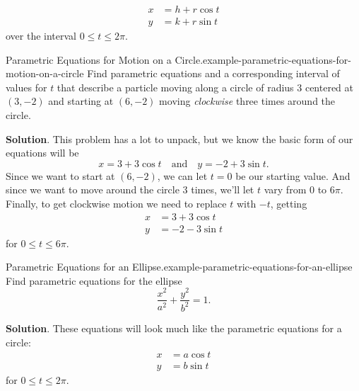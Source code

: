 \documentclass[10pt,]{book}
\numberwithin{equation}{section}
\newcommand{\qq}[1]{\quad\text{#1}\quad}
\newcommand{\amp}{&}
\begin{document}
\begin{align*}
x \amp = h + r\cos t \\
y \amp = k + r\sin t 
\end{align*}
over the interval \(0\leq t\leq 2\pi\).%
\begin{example}{Parametric Equations for Motion on a Circle.}{example-parametric-equations-for-motion-on-a-circle}%
\hypertarget{p-1000}{}%
Find parametric equations and a corresponding interval of values for \(t\) that describe a particle moving along a circle of radius \(3\) centered at \((3,-2)\) and starting at \((6,-2)\) moving \emph{clockwise} three times around the circle.%
\par\smallskip%
\noindent\textbf{Solution}.\hypertarget{solution-201}{}\quad%
\hypertarget{p-1001}{}%
This problem has a lot to unpack, but we know the basic form of our equations will be%
\begin{equation*}
x = 3 + 3\cos t\qq{and} y = -2 + 3\sin t\text{.}
\end{equation*}
Since we want to start at \((6,-2)\), we can let \(t = 0\) be our starting value. And since we want to move around the circle \(3\) times, we'll let \(t\) vary from \(0\) to \(6\pi\). Finally, to get clockwise motion we need to replace \(t\) with \(-t\), getting%
\begin{align*}
x \amp = 3 + 3\cos t \\
y \amp = -2 - 3\sin t 
\end{align*}
for \(0\leq t\leq 6\pi\).%
\end{example}
\begin{example}{Parametric Equations for an Ellipse.}{example-parametric-equations-for-an-ellipse}%
\hypertarget{p-1002}{}%
Find parametric equations for the ellipse%
\begin{equation*}
\frac{x^{2}}{a^{2}} + \frac{y^{2}}{b^{2}} = 1\text{.}
\end{equation*}
%
\par\smallskip%
\noindent\textbf{Solution}.\hypertarget{solution-202}{}\quad%
\hypertarget{p-1003}{}%
These equations will look much like the parametric equations for a circle:%
\begin{align*}
x \amp = a\cos t \\
y \amp = b\sin t 
\end{align*}
for \(0\leq t\leq 2\pi\).%
\end{example}
%
%
\typeout{************************************************}
\typeout{************************************************}
%
\end{document}
